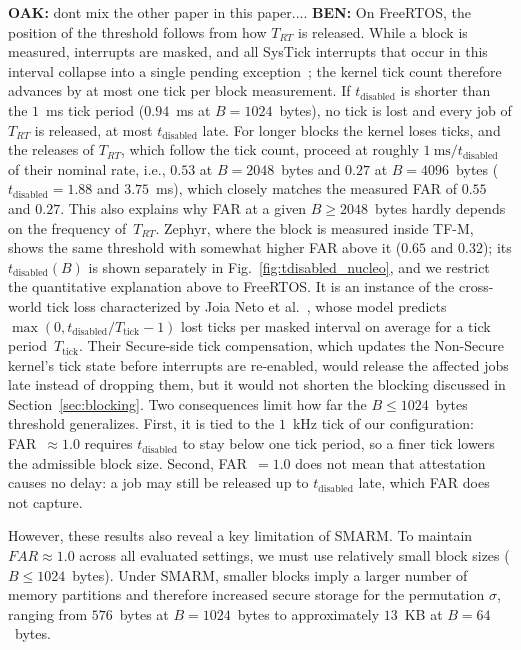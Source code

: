 \documentclass{ieeeaccess}
\DeclareRobustCommand{\oak}[1]{{\color{OAKcolor}\textbf{OAK:} #1}}
\DeclareRobustCommand{\ben}[1]{{\color{BENcolor}\textbf{BEN:} #1}}
\begin{document}
\oak{dont mix the other paper in this paper....}
\ben{On FreeRTOS, the position of the threshold follows from how $T_{RT}$ is released.
While a block is measured, interrupts are masked, and all SysTick interrupts that occur in this interval collapse into a single pending exception~\cite{armv8m-arm}; the kernel tick count therefore advances by at most one tick per block measurement.
If $t_{\text{disabled}}$ is shorter than the $1$~ms tick period ($0.94$~ms at $B = 1024$~bytes), no tick is lost and every job of $T_{RT}$ is released, at most $t_{\text{disabled}}$ late.
For longer blocks the kernel loses ticks, and the releases of $T_{RT}$, which follow the tick count, proceed at roughly $1~\text{ms}/t_{\text{disabled}}$ of their nominal rate, i.e., $0.53$ at $B = 2048$~bytes and $0.27$ at $B = 4096$~bytes ($t_{\text{disabled}} = 1.88$ and $3.75$~ms), which closely matches the measured FAR of $0.55$ and $0.27$.
This also explains why FAR at a given $B \ge 2048$~bytes hardly depends on the frequency of~$T_{RT}$.
Zephyr, where the block is measured inside TF-M, shows the same threshold with somewhat higher FAR above it ($0.65$ and $0.32$); its $t_{\text{disabled}}(B)$ is shown separately in Fig.~\ref{fig:tdisabled_nucleo}, and we restrict the quantitative explanation above to FreeRTOS.
It is an instance of the cross-world tick loss characterized by Joia Neto et al.~\cite{joianeto2026timekeeping}, whose model predicts $\max(0, t_{\text{disabled}}/T_{\text{tick}} - 1)$ lost ticks per masked interval on average for a tick period~$T_{\text{tick}}$.
Their Secure-side tick compensation, which updates the Non-Secure kernel's tick state before interrupts are re-enabled, would release the affected jobs late instead of dropping them, but it would not shorten the blocking discussed in Section~\ref{sec:blocking}.
Two consequences limit how far the $B \le 1024$~bytes threshold generalizes.
First, it is tied to the $1$~kHz tick of our configuration: FAR~$\approx 1.0$ requires $t_{\text{disabled}}$ to stay below one tick period, so a finer tick lowers the admissible block size.
Second, FAR~$= 1.0$ does not mean that attestation causes no delay: a job may still be released up to $t_{\text{disabled}}$ late, which FAR does not capture.}


However, these results also reveal a key limitation of SMARM.
To maintain $FAR \approx 1.0$ across all evaluated settings, we must use relatively small block sizes ($B \leq 1024$~bytes).
Under SMARM, smaller blocks imply a larger number of memory partitions and therefore increased secure storage for the permutation $\sigma$, ranging from $576$~bytes at $B = 1024$~bytes to approximately $13$~KB at $B = 64$~bytes.
\end{document}
